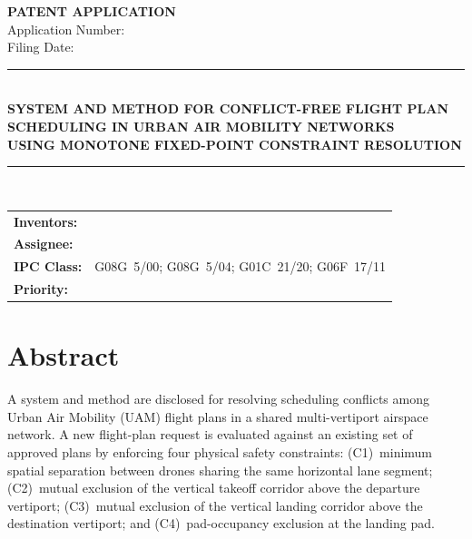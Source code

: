 \documentclass[12pt,a4paper]{article}
\begin{document}

\begin{center}
  \vspace*{1.5cm}
  {\LARGE\bfseries PATENT APPLICATION}\\[0.6cm]
  {\large Application Number: \underline{\hspace{4cm}}}\\[0.2cm]
  {\large Filing Date: \underline{\hspace{4cm}}}\\[1.5cm]

  \rule{\linewidth}{1pt}\\[0.4cm]
  {\LARGE\bfseries
    SYSTEM AND METHOD FOR CONFLICT-FREE FLIGHT PLAN\\
    SCHEDULING IN URBAN AIR MOBILITY NETWORKS\\
    USING MONOTONE FIXED-POINT CONSTRAINT RESOLUTION
  }\\[0.4cm]
  \rule{\linewidth}{1pt}\\[1.5cm]

  \begin{tabular}{ll}
    \textbf{Inventors:}  & \underline{\hspace{8cm}} \\[0.3cm]
    \textbf{Assignee:}   & \underline{\hspace{8cm}} \\[0.3cm]
    \textbf{IPC Class:}  & G08G~5/00;\; G08G~5/04;\; G01C~21/20;\; G06F~17/11 \\[0.3cm]
    \textbf{Priority:}   & \underline{\hspace{8cm}} \\
  \end{tabular}
\end{center}

\newpage
\tableofcontents
\newpage

\section{Abstract}

A system and method are disclosed for resolving scheduling conflicts among
Urban Air Mobility (UAM) flight plans in a shared multi-vertiport airspace
network.  A new flight-plan request is evaluated against an existing set of
approved plans by enforcing four physical safety constraints: (C1)~minimum
spatial separation between drones sharing the same horizontal lane segment;
(C2)~mutual exclusion of the vertical takeoff corridor above the departure
vertiport; (C3)~mutual exclusion of the vertical landing corridor above the
destination vertiport; and (C4)~pad-occupancy exclusion at the landing pad.
\end{document}
